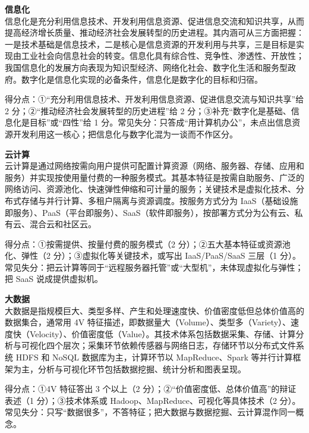 \documentclass[a4paper,11pt]{article}
\begin{document}


\q \textbf{信息化}\\
信息化是充分利用信息技术、开发利用信息资源、促进信息交流和知识共享，从而提高经济增长质量、推动经济社会发展转型的历史进程。其内涵可从三方面把握：一是技术基础是信息技术，二是核心是信息资源的开发利用与共享，三是目标是实现由工业社会向信息社会的转变。信息化具有综合性、竞争性、渗透性、开放性；我国信息化的发展方向表现为知识型经济、网络化社会、数字化生活和服务型政府。数字化是信息化实现的必备条件，信息化是数字化的目标和归宿。
\begin{analysis}得分点：①“充分利用信息技术、开发利用信息资源、促进信息交流与知识共享”给 2 分；②“推动经济社会发展转型的历史进程”给 2 分；③补充“数字化是基础、信息化是目标”或“四性”给 1 分。常见失分：只答成“用计算机办公”，未点出信息资源开发利用这一核心；把信息化与数字化混为一谈而不作区分。\end{analysis}

\q \textbf{云计算}\\
云计算是通过网络按需向用户提供可配置计算资源（网络、服务器、存储、应用和服务）并实现按使用量付费的一种服务模式。其基本特征是按需自助服务、广泛的网络访问、资源池化、快速弹性伸缩和可计量的服务；关键技术是虚拟化技术、分布式存储与并行计算、多租户隔离与资源调度。按服务方式分为 IaaS（基础设施即服务）、PaaS（平台即服务）、SaaS（软件即服务），按部署方式分为公有云、私有云、混合云和社区云。
\begin{analysis}得分点：①按需提供、按量付费的服务模式（2 分）；②五大基本特征或资源池化、弹性（2 分）；③虚拟化等关键技术，或写出 IaaS/PaaS/SaaS 三层（1 分）。常见失分：把云计算等同于“远程服务器托管”或“大型机”，未体现虚拟化与弹性；把 SaaS 说成提供虚拟机。\end{analysis}

\q \textbf{大数据}\\
大数据是指规模巨大、类型多样、产生和处理速度快、价值密度低但总体价值高的数据集合，通常用 4V 特征描述，即数据量大（Volume）、类型多（Variety）、速度快（Velocity）、价值密度低（Value）。其技术体系包括数据采集、存储、计算分析与可视化四个层次；采集环节依赖传感器与网络日志，存储环节以分布式文件系统 HDFS 和 NoSQL 数据库为主，计算环节以 MapReduce、Spark 等并行计算框架为主，分析与可视化环节包括数据挖掘、统计分析和图表呈现。
\begin{analysis}得分点：①4V 特征答出 3 个以上（2 分）；②“价值密度低、总体价值高”的辩证表述（1 分）；③技术体系或 Hadoop、MapReduce、可视化等具体技术（2 分）。常见失分：只写“数据很多”，不答特征；把大数据与数据挖掘、云计算混作同一概念。\end{analysis}
\end{document}

